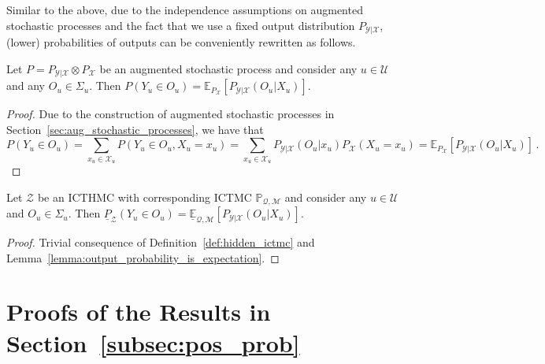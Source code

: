 \documentclass[twoside,11pt]{article}
\newcommand{\states}{\mathcal{X}}
\newcommand{\observs}{\mathcal{Y}}
\newcommand{\lexp}{\underline{\mathbb{E}}_{\rateset,\mathcal{M}}}
\newcommand{\rateset}{\mathcal{Q}}
\begin{document}
Similar to the above, due to the independence assumptions on augmented stochastic processes and the fact that we use a fixed output distribution $P_{\observs\vert\states}$, (lower) probabilities of outputs can be conveniently rewritten as follows.
\begin{lemma}\label{lemma:output_probability_is_expectation}
Let $P=P_{\observs\vert\states}\otimes P_\states$ be an augmented stochastic process and consider any $u\in\mathcal{U}$ and any $O_u\in\Sigma_u$. Then $P(Y_u\in O_u)=\mathbb{E}_{P_\states}[P_{\observs\vert\states}(O_u\vert X_u)]$.
\end{lemma}
\begin{proof}
Due to the construction of augmented stochastic processes in Section~\ref{sec:aug_stochastic_processes}, we have that
\begin{equation*}
P(Y_u\in O_u) = \sum_{x_u\in\states_u} P(Y_u\in O_u, X_u=x_u) 
 = \sum_{x_u\in\states_u} P_{\observs\vert\states}(O_u\vert x_u)P_\states(X_u=x_u) 
 = \mathbb{E}_{P_\states}[P_{\observs\vert\states}(O_u\vert X_u)]\,.
\end{equation*}
\end{proof}
\begin{lemma}\label{lemma:lower_output_probability_is_expectation}
Let $\mathcal{Z}$ be an ICTHMC with corresponding ICTMC $\mathbb{P}_{\rateset,\mathcal{M}}$ and consider any $u\in\mathcal{U}$ and $O_u\in\Sigma_u$. Then $\underline{P}_{\mathcal{Z}}(Y_u\in O_u)=\lexp[P_{\observs\vert\states}(O_u\vert X_u)]$.
\end{lemma}
\begin{proof}
Trivial consequence of Definition~\ref{def:hidden_ictmc} and Lemma~\ref{lemma:output_probability_is_expectation}.
\end{proof}

\section{Proofs of the Results in Section~\ref{subsec:pos_prob}}
\end{document}
